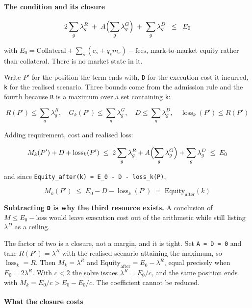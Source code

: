 \documentclass[10pt,a4paper]{article}
\begin{document}
\paragraph{The condition and its closure}\label{the-condition-and-its-closure}

\[
2\sum_g \lambda_g^{R}\;+\;A\Bigl(\sum_g \lambda_g^{G}\Bigr)\;+\;\sum_g \lambda_g^{D}
\;\;\le\;\; E_0
\]

with \(E_0=\text{Collateral}+\sum_s (c_s+q_s m_s)-\text{fees}\), mark-to-market
equity rather than collateral. There is no market state in it.

Write \(P'\) for the position the term ends with, \texttt{D} for the execution cost it
incurred, \texttt{k} for the realised scenario. Three bounds come from the admission
rule and the fourth because \texttt{R} is a maximum over a set containing \texttt{k}:

\[
R(P')\le\sum_g \lambda_g^{R},
\quad
G_k(P')\le\sum_g \lambda_g^{G},
\quad
D\le\sum_g \lambda_g^{D},
\quad
\operatorname{loss}_k(P')\le R(P')
\]

Adding requirement, cost and realised loss:

\[
M_k(P')+D+\operatorname{loss}_k(P')
\;\le\;
2\sum_g \lambda_g^{R}+A\Bigl(\sum_g \lambda_g^{G}\Bigr)+\sum_g \lambda_g^{D}
\;\le\; E_0
\]

and since \texttt{Equity\_after(k)\ =\ E\_0\ -\ D\ -\ loss\_k(P\textquotesingle{})},

\[
M_k(P')\;\le\;E_0-D-\operatorname{loss}_k(P')\;=\;\mathrm{Equity}_{\text{after}}(k)
\]

\textbf{Subtracting \texttt{D} is why the third resource exists.} A conclusion of
\(M\le E_0-\text{loss}\) would leave execution cost out of the arithmetic while still
listing \(\lambda^{D}\) as a ceiling.

The factor of two is a closure, not a margin, and it is tight. Set \texttt{A\ =\ D\ =\ 0}
and take \(R(P')=\lambda^R\) with the realised scenario attaining the maximum, so
\(\operatorname{loss}_k=R\). Then \(M_k=\lambda^R\) and \(\mathrm{Equity}_{\text{after}}=E_0-\lambda^R\), equal precisely
when \(E_0=2\lambda^R\). With \(c<2\) the solve issues \(\lambda^R=E_0/c\), and the same
position ends with \(M_k=E_0/c>E_0-E_0/c\). The coefficient cannot be reduced.

\paragraph{What the closure costs}\label{what-the-closure-costs}
\end{document}
